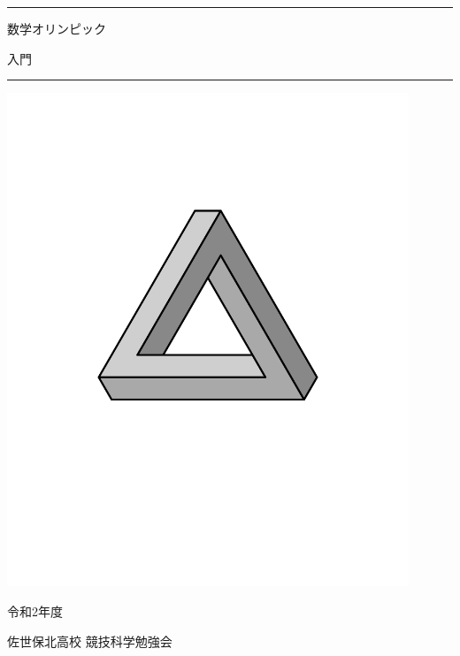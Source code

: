 \documentclass[uplatex,dvipdfmx]{jsbook}
\begin{document}
\begin{titlepage}
    \begin{center}
        \hrule height 2pt

        \vspace{10pt}

        {\fontsize{60pt}{3pt}\selectfont 数学オリンピック}

        \vspace{10pt}

        {\fontsize{60pt}{3pt}\selectfont 入門}

        \vspace{10pt}

        \hrule height 2pt

        \vspace{70pt}

        \includegraphics[clip,width=12cm]{figures/PenroseTriangle.pdf}

        \vspace{70pt}

        {\Large 令和2年度}

        \vspace{30pt}

        {\LARGE 佐世保北高校 競技科学勉強会}
    \end{center}
\end{titlepage}
\end{document}
